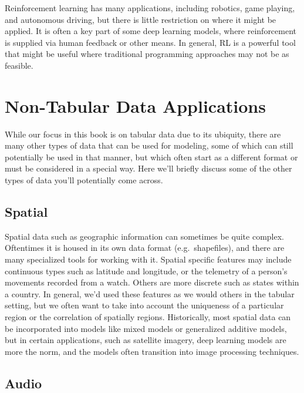 \documentclass[
  letterpaper,
]{krantz}
\begin{document}
Reinforcement learning has many applications, including robotics, game
playing, and autonomous driving, but there is little restriction on
where it might be applied. It is often a key part of some deep learning
models, where reinforcement is supplied via human feedback or other
means. In general, RL is a powerful tool that might be useful where
traditional programming approaches may not be as feasible.

\section{Non-Tabular Data
Applications}\label{non-tabular-data-applications}

While our focus in this book is on tabular data due to its ubiquity,
there are many other types of data that can be used for modeling, some
of which can still potentially be used in that manner, but which often
start as a different format or must be considered in a special way. Here
we'll briefly discuss some of the other types of data you'll potentially
come across.

\subsection{Spatial}\label{spatial}

Spatial data such as geographic information can sometimes be quite
complex. Oftentimes it is housed in its own data format
(e.g.~shapefiles), and there are many specialized tools for working with
it. Spatial specific features may include continuous types such as
latitude and longitude, or the telemetry of a person's movements
recorded from a watch. Others are more discrete such as states within a
country. In general, we'd used these features as we would others in the
tabular setting, but we often want to take into account the uniqueness
of a particular region or the correlation of spatially regions.
Historically, most spatial data can be incorporated into models like
mixed models or generalized additive models, but in certain
applications, such as satellite imagery, deep learning models are more
the norm, and the models often transition into image processing
techniques.

\subsection{Audio}\label{audio}
\end{document}
